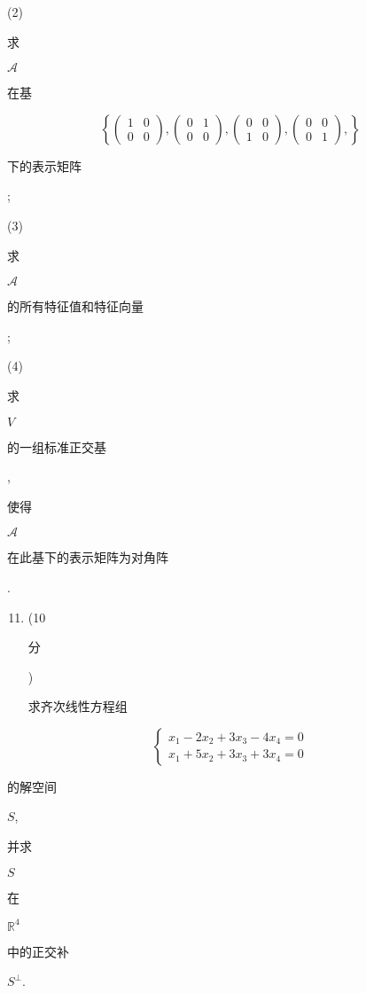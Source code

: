 \documentclass[10pt]{article}
\begin{document}
(2) \begin{CJK}{UTF8}{mj}求\end{CJK} $\mathcal{A}$ \begin{CJK}{UTF8}{mj}在基\end{CJK}
$$
\left\{\left(\begin{array}{ll}
1 & 0 \\
0 & 0
\end{array}\right),\left(\begin{array}{ll}
0 & 1 \\
0 & 0
\end{array}\right),\left(\begin{array}{ll}
0 & 0 \\
1 & 0
\end{array}\right),\left(\begin{array}{ll}
0 & 0 \\
0 & 1
\end{array}\right),\right\}
$$
\begin{CJK}{UTF8}{mj}下的表示矩阵\end{CJK};

(3) \begin{CJK}{UTF8}{mj}求\end{CJK} $\mathcal{A}$ \begin{CJK}{UTF8}{mj}的所有特征值和特征向量\end{CJK};

(4) \begin{CJK}{UTF8}{mj}求\end{CJK} $V$ \begin{CJK}{UTF8}{mj}的一组标准正交基\end{CJK}, \begin{CJK}{UTF8}{mj}使得\end{CJK} $\mathcal{A}$ \begin{CJK}{UTF8}{mj}在此基下的表示矩阵为对角阵\end{CJK}.

\begin{enumerate}
  \setcounter{enumi}{10}
  \item (10 \begin{CJK}{UTF8}{mj}分\end{CJK}) \begin{CJK}{UTF8}{mj}求齐次线性方程组\end{CJK}
\end{enumerate}
$$
\left\{\begin{array}{l}
x_{1}-2 x_{2}+3 x_{3}-4 x_{4}=0 \\
x_{1}+5 x_{2}+3 x_{3}+3 x_{4}=0
\end{array}\right.
$$
\begin{CJK}{UTF8}{mj}的解空间\end{CJK} $S$, \begin{CJK}{UTF8}{mj}并求\end{CJK} $S$ \begin{CJK}{UTF8}{mj}在\end{CJK} $\mathbb{R}^{4}$ \begin{CJK}{UTF8}{mj}中的正交补\end{CJK} $S^{\perp}$.
\end{document}
